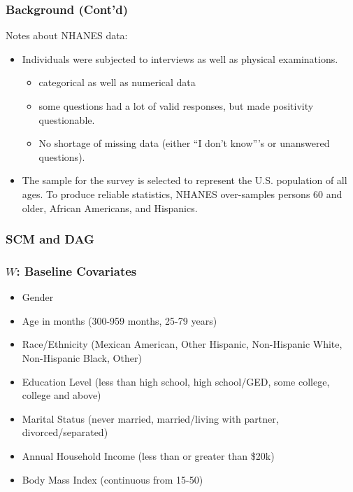 \documentclass{beamer}
\begin{document}
\begin{frame}
  \frametitle{Background (Cont'd)}
  Notes about NHANES data:
  \begin{itemize}
 \item Individuals were subjected to interviews as well as physical examinations.
  \begin{itemize}
    \item categorical as well as numerical data
    \item some questions had a lot of valid responses, but made positivity questionable.
    \item No shortage of missing data (either ``I don't know'''s or unanswered questions).
  \end{itemize}
 \item The sample for the survey is selected to represent the U.S. population of all ages. To produce reliable statistics, NHANES over-samples persons 60 and older, African Americans, and Hispanics.
 \end{itemize}
\end{frame}

\begin{frame}
\frametitle{SCM and DAG}
\end{frame}

\begin{frame}
\frametitle{$W$: Baseline Covariates}
   \begin{itemize}
   \item Gender \\
   \item Age in months (300-959 months, 25-79 years) \\
   \item Race/Ethnicity (Mexican American, Other Hispanic, Non-Hispanic White, Non-Hispanic Black, Other) \\
   \item Education Level (less than high school, high school/GED, some college, college and above) \\
   \item Marital Status (never married, married/living with partner, divorced/separated) \\
   \item Annual Household Income (less than or greater than \$20k) \\
   \item Body Mass Index (continuous from 15-50) \\
  \end{itemize}

\end{frame}
\end{document}
